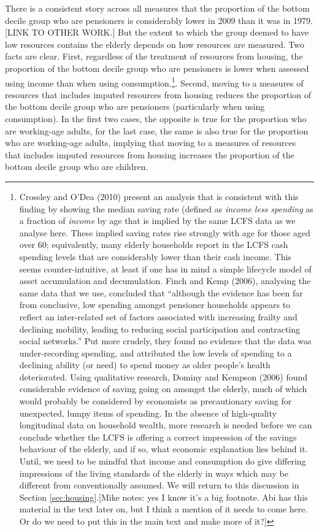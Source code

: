 There is a consistent story across all measures that the proportion of the bottom decile group who are pensioners is considerably lower in 2009 than it was in 1979. [LINK TO OTHER WORK.] But the extent to which the group deemed to have low resources contains the elderly depends on how resources are measured. Two facts are clear. First, regardless of the treatment of resources from housing, the proportion of the bottom decile group who are pensioners is lower when assessed using income than when using consumption.\footnote{Crossley and O'Dea (2010) present an analysis that is consistent with this finding by showing the median saving rate (defined as \emph{income less spending} as a fraction of \emph{income} by age that is implied by the same LCFS data as we analyse here. These implied saving rates rise strongly with age for those aged over 60; equivalently, many elderly households report in the LCFS cash spending levels that are considerably lower than their cash income. This seems counter-intuitive, at least if one has in mind a simple lifecycle model of asset accumulation and decumulation. Finch and Kemp (2006), analysing the same data that we use, concluded that ``although the evidence has been far from conclusive, low spending amongst pensioner households appears to reflect an inter-related set of factors associated with increasing frailty and declining mobility, leading to reducing social participation and contracting social networks.'' Put more crudely, they found no evidence that the data was under-recording spending, and attributed the low levels of spending to a declining ability (or need) to spend money as older people's health deteriorated. Using qualitative research, Dominy and Kempson (2006) found considerable evidence of saving going on amongst the elderly, much of which would probably be considered by economists as precautionary saving for unexpected, lumpy items of spending. In the absence of high-quality longitudinal data on household wealth, more research is needed before we can conclude whether the LCFS is offering a correct impression of the savings behaviour of the elderly, and if so, what economic explanation lies behind it. Until, we need to be mindful that income and consumption do give differing impressions of the living standards of the elderly in ways which may be different from conventionally assumed. We will return to this discussion in Section \ref{sec:housing}.[Mike notes: yes I know it's a big footnote. Abi has this material in the text later on, but I think a mention of it needs to come here. Or do we need to put this in the main text and make more of it?]}. Second, moving to a measures of resources that includes imputed resources from housing reduces the proportion of the bottom decile group who are pensioners (particularly when using consumption). In the first two cases, the opposite is true for the  proportion who are working-age adults, for the last case, the same is also true for the proportion who are working-age adults, implying that moving to a measures of resources that includes imputed resources from housing increases the proportion of the bottom decile group who are children.

